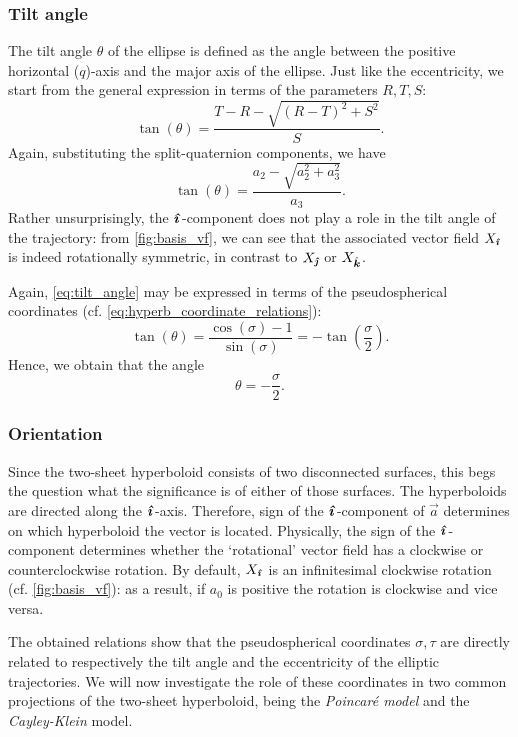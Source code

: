 \subsubsection{Tilt angle} The tilt angle $\theta$ of the ellipse is defined as the angle between the positive horizontal ($q$)-axis and the major axis of the ellipse. Just like the eccentricity, we start from the general expression in terms of the parameters $R, T, S$:
\begin{equation}
    \tan(\theta) = \frac{T - R - \sqrt{(R - T)^2 + S^2}}{S}.
\end{equation}
Again, substituting the split-quaternion components, we have
\begin{equation}
    \tan(\theta) = \frac{a_2 - \sqrt{a_2^2 + a_3^2}}{a_3}.
    \label{eq:tilt_angle}
\end{equation}
Rather unsurprisingly, the $\quati$-component does not play a role in the tilt angle of the trajectory: from \cref{fig:basis_vf}, we can see that the associated vector field $X_\quati$ is indeed rotationally symmetric, in contrast to $X_\quatj$ or $X_\quatk$.

Again, \cref{eq:tilt_angle} may be expressed in terms of the pseudospherical coordinates (cf. \cref{eq:hyperb_coordinate_relations}):
$$ \tan(\theta) = \frac{\cos(\sigma) - 1}{\sin(\sigma)} = -\tan(\frac{\sigma}{2}).$$
Hence, we obtain that the angle 
$$\theta = -\frac{\sigma}{2}.$$

\subsubsection{Orientation} Since the two-sheet hyperboloid consists of two disconnected surfaces, this begs the question what the significance is of either of those surfaces. The hyperboloids are directed along the $\quati$-axis. Therefore, sign of the $\quati$-component of $\vec{a}$ determines on which hyperboloid the vector is located. Physically, the sign of the $\quati$-component determines whether the `rotational' vector field has a clockwise or counterclockwise rotation. By default, $X_\quati$ is an infinitesimal clockwise rotation (cf. \cref{fig:basis_vf}): as a result, if $a_0$ is positive the rotation is clockwise and vice versa.

The obtained relations show that the pseudospherical coordinates $\sigma, \tau$ are directly related to respectively the tilt angle and the eccentricity of the elliptic trajectories. We will now investigate the role of these coordinates in two common projections of the two-sheet hyperboloid, being the \emph{Poincaré model} and the \emph{Cayley-Klein} model.

